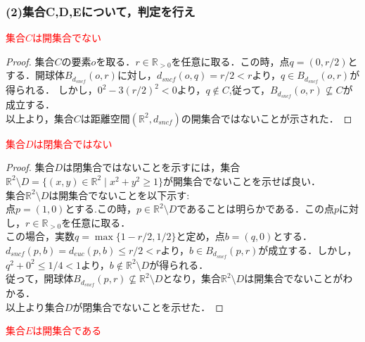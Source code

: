 \documentclass{jreport}
\newcommand{\de}{d_{euc}}
\newcommand{\ds}{d_{sncf}}
\newcommand{\bs}{B_{\ds}}
\newcommand{\R}{\mathbb{R}}
\newcommand{\Rp}{\mathbb{R}_{>0}}
\begin{document}
\subsubsection{(2)集合C,D,Eについて，判定を行え}
\textcolor{red}{集合$C$は開集合でない}
\begin{proof}
集合$C$の要素$o$を取る．$r \in \Rp$を任意に取る．この時，点$q=(0,r/2)$とする．開球体$\bs(o,r)$に対し，$\ds(o,q)=r/2 <r$より，$q \in \bs(o,r)$が得られる．
しかし，$0^2-3(r/2)^2<0$より，$q \notin C$,従って，$\bs(o,r) \not\subseteq C$が成立する．\\
以上より，集合$C$は距離空間$(\R^2,\ds)$の開集合ではないことが示された．
\end{proof}
\textcolor{red}{集合$D$は閉集合ではない}
\begin{proof}
集合$D$は閉集合ではないことを示すには，集合$\R^2 \setminus D =\{(x,y) \in \R^2 \mid x^2+y^2 \ge 1\}$が開集合でないことを示せば良い．\\
集合$\R^2 \setminus D$は開集合でないことを以下示す:\\
点$p=(1,0)$とする.この時，$p \in \R^2 \setminus D$であることは明らかである．この点$p$に対し，$r \in \Rp$を任意に取る．\\
この場合，実数$q=\max\{1-r/2,1/2\}$と定め，点$b=(q,0)$とする．\\
$\ds(p,b)=\de(p,b) \le r/2 <r$より，$b \in \bs(p,r)$が成立する．しかし，$q^2+0^2 \le 1/4 <1$より，$b \notin \R^2 \setminus D$が得られる．\\
従って，開球体$\bs(p,r) \not\subseteq \R^2 \setminus D$となり，集合$\R^2 \setminus D$は開集合でないことがわかる．\\
以上より集合$D$が閉集合でないことを示せた．
\end{proof}
\textcolor{red}{集合$E$は開集合である}
\end{document}
